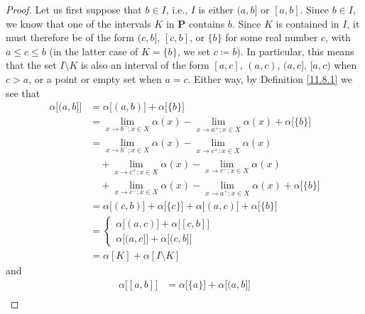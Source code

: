 \begin{proof}
            Let us first suppose that \(b \in I\), i.e., \(I\) is either \((a, b]\) or \([a, b]\).
    Since \(b \in I\), we know that one of the intervals \(K\) in \(\mathbf{P}\) contains \(b\).
    Since \(K\) is contained in \(I\), it must therefore be of the form \((c, b]\), \([c, b]\), or \(\{b\}\) for some real number \(c\), with \(a \leq c \leq b\) (in the latter case of \(K = \{b\}\), we set \(c \coloneqq b\)).
    In particular, this means that the set \(I \setminus K\) is also an interval of the form \([a, c]\), \((a, c)\), \((a, c]\), \([a, c)\) when \(c > a\), or a point or empty set when \(a = c\).
    Either way, by Definition \ref{11.8.1} we see that
    \begin{align*}
        \alpha\big[(a, b]\big] & = \alpha\big[(a, b)\big] + \alpha\big[\{b\}\big]                                                            \\
                               & = \lim_{x \to b^- ; x \in X} \alpha(x) - \lim_{x \to a^+ ; x \in X} \alpha(x) + \alpha\big[\{b\}\big]       \\
                               & = \lim_{x \to b^- ; x \in X} \alpha(x) - \lim_{x \to c^+ ; x \in X} \alpha(x)                               \\
                               & \quad + \lim_{x \to c^+ ; x \in X} \alpha(x) - \lim_{x \to c^- ; x \in X} \alpha(x)                         \\
                               & \quad + \lim_{x \to c^- ; x \in X} \alpha(x) - \lim_{x \to a^+ ; x \in X} \alpha(x) + \alpha\big[\{b\}\big] \\
                               & = \alpha\big[(c, b)\big] + \alpha\big[\{c\}\big] + \alpha\big[(a, c)\big] + \alpha\big[\{b\}\big]           \\
                               & = \begin{cases}
                                       \alpha\big[(a, c)\big] + \alpha\big[[c, b]\big] \\
                                       \alpha\big[(a, c]\big] + \alpha\big[(c, b]\big]
                                   \end{cases}                           \\
                               & = \alpha[K] + \alpha[I \setminus K]
    \end{align*}
    and
    \begin{align*}
        \alpha\big[[a, b]\big] & = \alpha\big[\{a\}\big] + \alpha\big[(a, b]\big]                                                          \\

\end{align*}
\end{proof}
